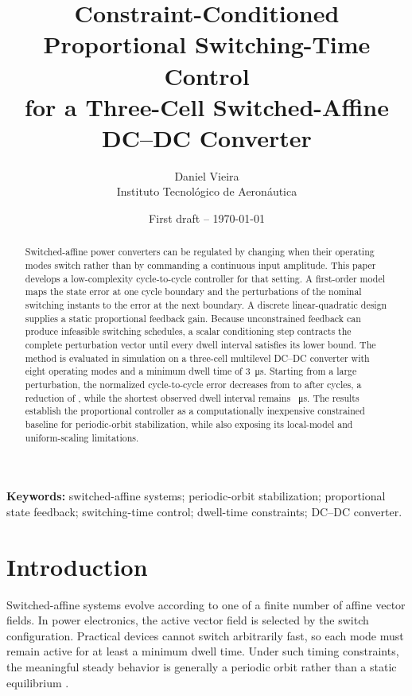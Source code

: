 \documentclass[11pt]{article}
\title{Constraint-Conditioned Proportional Switching-Time Control\\
for a Three-Cell Switched-Affine DC--DC Converter}
\author{Daniel Vieira\\
Instituto Tecnol\'ogico de Aeron\'autica}
\date{First draft -- \today}
\begin{document}
\maketitle

\begin{abstract}
Switched-affine power converters can be regulated by changing when their operating modes switch rather than by commanding a continuous input amplitude. This paper develops a low-complexity cycle-to-cycle controller for that setting. A first-order model maps the state error at one cycle boundary and the perturbations of the nominal switching instants to the error at the next boundary. A discrete linear-quadratic design supplies a static proportional feedback gain. Because unconstrained feedback can produce infeasible switching schedules, a scalar conditioning step contracts the complete perturbation vector until every dwell interval satisfies its lower bound. The method is evaluated in simulation on a three-cell multilevel DC--DC converter with eight operating modes and a minimum dwell time of \SI{3}{\micro\second}. Starting from a large perturbation, the normalized cycle-to-cycle error decreases from \InitialNormalizedError{} to \ControlledFinalError{} after \SimulationCycles{} cycles, a reduction of \ControlledErrorReduction{}, while the shortest observed dwell interval remains \MinimumObservedDwell{}~\si{\micro\second}. The results establish the proportional controller as a computationally inexpensive constrained baseline for periodic-orbit stabilization, while also exposing its local-model and uniform-scaling limitations.
\end{abstract}

\noindent\textbf{Keywords:} switched-affine systems; periodic-orbit stabilization; proportional state feedback; switching-time control; dwell-time constraints; DC--DC converter.

\section{Introduction}

Switched-affine systems evolve according to one of a finite number of affine vector fields. In power electronics, the active vector field is selected by the switch configuration. Practical devices cannot switch arbitrarily fast, so each mode must remain active for at least a minimum dwell time. Under such timing constraints, the meaningful steady behavior is generally a periodic orbit rather than a static equilibrium \cite{benmiloud2019,egidio2020,vieira2024}.
\end{document}

